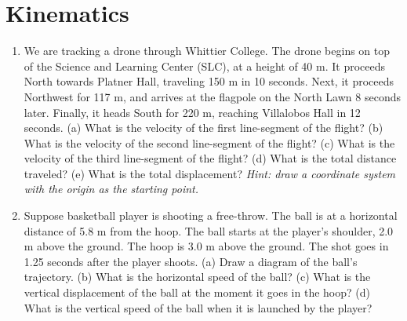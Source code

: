 \documentclass[10pt]{article}
\begin{document}
\section{Kinematics}
\begin{enumerate}
\item We are tracking a drone through Whittier College.  The drone begins on top of the Science and Learning Center (SLC), at a height of 40 m.  It proceeds North towards Platner Hall, traveling 150 m in 10 seconds.  Next, it proceeds Northwest for 117 m, and arrives at the flagpole on the North Lawn 8 seconds later. Finally, it heads South for 220 m, reaching Villalobos Hall in 12 seconds.  (a) What is the velocity of the first line-segment of the flight?  (b) What is the velocity of the second line-segment of the flight? (c) What is the velocity of the third line-segment of the flight?  (d) What is the total distance traveled? (e) What is the total displacement? \textit{Hint: draw a coordinate system with the origin as the starting point.} \\ \vspace{2.5cm}
\item Suppose basketball player is shooting a free-throw.  The ball is at a horizontal distance of 5.8 m from the hoop.  The ball starts at the player's shoulder, 2.0 m above the ground.  The hoop is 3.0 m above the ground.  The shot goes in 1.25 seconds after the player shoots.  (a) Draw a diagram of the ball's trajectory. (b) What is the horizontal speed of the ball? (c) What is the vertical displacement of the ball at the moment it goes in the hoop? (d) What is the vertical speed of the ball when it is launched by the player? \\ \vspace{2.0cm}
\end{enumerate}
\end{document}
